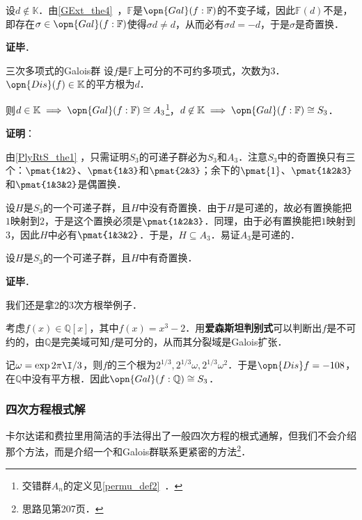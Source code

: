设$d\not\in\mathbb{K}$．由\autoref{GExt_the4}~，$\mathbb{F}$是$\opn{Gal}(f:\mathbb{F})$的不变子域，因此$\mathbb{F}(d)$不是，即存在$\sigma\in\opn{Gal}(f:\mathbb{F})$使得$\sigma d\neq d$，从而必有$\sigma d= -d$，于是$\sigma$是奇置换．

\textbf{证毕}．


\begin{corollary}{三次多项式的Galois群}\label{PlyRtS_cor1}
设$f$是$\mathbb{F}$上可分的不可约多项式，次数为$3$．$\opn{Dis}(f)\in\mathbb{K}$的平方根为$d$．

则$d\in\mathbb{K}\implies\opn{Gal}(f:\mathbb{F})\cong A_3$\footnote{交错群$A_n$的定义见\autoref{permu_def2}~．}，$d\not\in\mathbb{K}\implies\opn{Gal}(f:\mathbb{F})\cong S_3$．
\end{corollary}

\textbf{证明}：

由\autoref{PlyRtS_the1} ，只需证明$S_3$的可递子群必为$S_3$和$A_3$．注意$S_3$中的奇置换只有三个：$\pmat{1&2}$、$\pmat{1&3}$和$\pmat{2&3}$；余下的$\pmat{1}$、$\pmat{1&2&3}$和$\pmat{1&3&2}$是偶置换．

设$H$是$S_3$的一个可递子群，且$H$中没有奇置换．由于$H$是可递的，故必有置换能把$1$映射到$2$，于是这个置换必须是$\pmat{1&2&3}$．同理，由于必有置换能把$1$映射到$3$，因此$H$中必有$\pmat{1&3&2}$．于是，$H\subseteq A_3$．易证$A_3$是可递的．

设$H$是$S_3$的一个可递子群，且$H$中有奇置换．

\textbf{证毕}．

\begin{example}{}
我们还是拿2的3次方根举例子．

考虑$f(x)\in\mathbb{Q}[x]$，其中$f(x)=x^3-2$．用\textbf{爱森斯坦判别式}可以判断出$f$是不可约的，由$\mathbb{Q}$是完美域可知$f$是可分的，从而其分裂域是Galois扩张．

记$\omega=\exp{2\pi\I/3}$，则$f$的三个根为$2^{1/3}, 2^{1/3}\omega, 2^{1/3}\omega^2$．于是$\opn{Dis}f=-108$，在$\mathbb{Q}$中没有平方根．因此$\opn{Gal}(f:\mathbb{Q})\cong S_3$．
\end{example}




\subsubsection{四次方程根式解}

卡尔达诺和费拉里用简洁的手法得出了一般四次方程的根式通解，但我们不会介绍那个方法，而是介绍一个和Galois群联系更紧密的方法\footnote{思路见\cite{GTM242}第207页．}．

